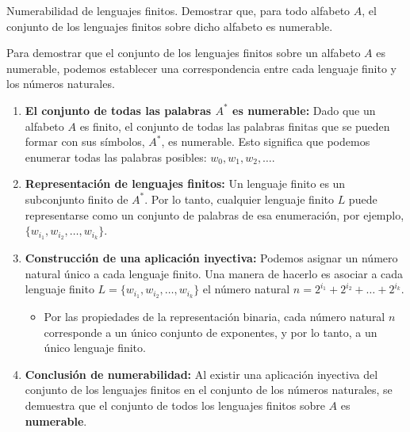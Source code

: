 \documentclass[12pt]{report} %
\begin{document}
\begin{ejercicio}
Numerabilidad de lenguajes finitos. Demostrar que, para todo alfabeto $A$, el conjunto de los lenguajes finitos sobre dicho alfabeto es numerable.
\end{ejercicio}

\begin{solucion}

Para demostrar que el conjunto de los lenguajes finitos sobre un alfabeto \(A\) es numerable, podemos establecer una correspondencia entre cada lenguaje finito y los números naturales.

\begin{enumerate}
    \item \textbf{El conjunto de todas las palabras \(A^*\) es numerable:} Dado que un alfabeto \(A\) es finito, el conjunto de todas las palabras finitas que se pueden formar con sus símbolos, \(A^*\), es numerable. Esto significa que podemos enumerar todas las palabras posibles: \(w_0, w_1, w_2, \dots\).

    \item \textbf{Representación de lenguajes finitos:} Un lenguaje finito es un subconjunto finito de \(A^*\). Por lo tanto, cualquier lenguaje finito \(L\) puede representarse como un conjunto de palabras de esa enumeración, por ejemplo, \(\{w_{i_1}, w_{i_2}, \dots, w_{i_k}\}\).

    \item \textbf{Construcción de una aplicación inyectiva:} Podemos asignar un número natural único a cada lenguaje finito. Una manera de hacerlo es asociar a cada lenguaje finito \(L = \{w_{i_1}, w_{i_2}, \dots, w_{i_k}\}\) el número natural \(n = 2^{i_1} + 2^{i_2} + \dots + 2^{i_k}\).
    \begin{itemize}
        \item Por las propiedades de la representación binaria, cada número natural \(n\) corresponde a un único conjunto de exponentes, y por lo tanto, a un único lenguaje finito.
    \end{itemize}

    \item \textbf{Conclusión de numerabilidad:} Al existir una aplicación inyectiva del conjunto de los lenguajes finitos en el conjunto de los números naturales, se demuestra que el conjunto de todos los lenguajes finitos sobre \(A\) es \textbf{numerable}.
\end{enumerate}

\end{solucion}
\end{document}
